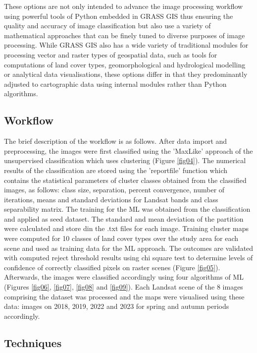 \documentclass[eprint,
approc,		%
]{actapoly}
\begin{document}
These options are not only intended to advance the image processing workflow using powerful tools of Python embedded in GRASS GIS thus ensuring the quality and accuracy of image classification but also use a variety of mathematical approaches that can be finely tuned to diverse purposes of image processing. While GRASS GIS also has a wide variety of traditional modules for processing vector and raster types of geospatial data, such as tools for computations of land cover types, geomorphological and hydrological modelling or analytical data visualisations, these options differ in that they predominantly adjusted to cartographic data using internal modules rather than Python algorithms. 

\subsection{Workflow}
The brief description of the workflow is as follows. After data import and preprocessing, the images were first classified using the 'MaxLike' approach of the unsupervised classification which uses clustering (Figure \ref{fig04}). The numerical results of the classification are stored using the 'reportfile' function which contains the statistical parameters of cluster classes obtained from the classified images, as follows: class size, separation, percent convergence, number of iterations, means and standard deviations for Landsat bands and class separability matrix. The training for the ML was obtained from the classification and applied as seed dataset. The standard and mean deviation of the partition were calculated and store din the .txt files for each image. Training cluster maps were computed for 10 classes of land cover types over the study area for each scene and used as training data for the ML approach. The outcomes are validated with computed reject threshold results using chi square test to determine levels of confidence of correctly classified pixels on raster scenes (Figure \ref{fig05}). Afterwards, the images were classified accordingly using four algorithms of ML (Figures \ref{fig06}, \ref{fig07}, \ref{fig08} and \ref{fig09}). Each Landsat scene of the 8 images comprising the dataset was processed and the maps were visualised using these data: images on 2018, 2019, 2022 and 2023 for spring and autumn periods accordingly. 

\subsection{Techniques}
\end{document}
